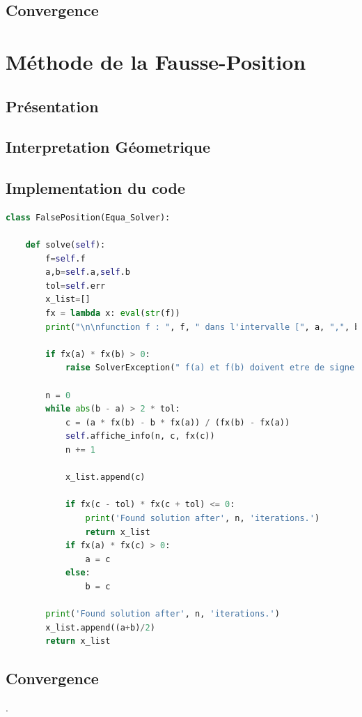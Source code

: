 \documentclass{article}
\begin{document}
\subsection{Convergence}






\newpage
\section{Méthode de la Fausse-Position}
\subsection{Présentation} 
    

\subsection{Interpretation Géometrique}
\subsection{Implementation du code}
\begin{lstlisting}[language=Python, caption=Méthode de la Fausse Position en Python]
class FalsePosition(Equa_Solver):

    def solve(self):
        f=self.f
        a,b=self.a,self.b
        tol=self.err
        x_list=[]
        fx = lambda x: eval(str(f))
        print("\n\nfunction f : ", f, " dans l'intervalle [", a, ",", b, "] \n", "--------------------------------")

        if fx(a) * fx(b) > 0:
            raise SolverException(" f(a) et f(b) doivent etre de signe different !")

        n = 0
        while abs(b - a) > 2 * tol:
            c = (a * fx(b) - b * fx(a)) / (fx(b) - fx(a))
            self.affiche_info(n, c, fx(c))
            n += 1

            x_list.append(c)

            if fx(c - tol) * fx(c + tol) <= 0:
                print('Found solution after', n, 'iterations.')
                return x_list
            if fx(a) * fx(c) > 0:
                a = c
            else:
                b = c
            
        print('Found solution after', n, 'iterations.')
        x_list.append((a+b)/2)
        return x_list
\end{lstlisting}
\newpage
\subsection{Convergence}
.
\end{document}

